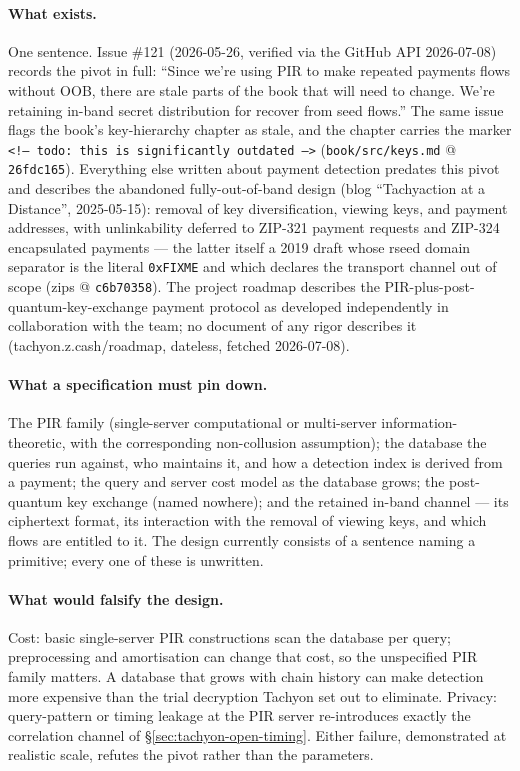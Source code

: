 \documentclass[11pt,a4paper]{article}
\theoremstyle{definition}
\begin{document}
\paragraph{What exists.} One sentence. Issue \#121 (2026-05-26, verified via
the GitHub API 2026-07-08) records the pivot in full: ``Since we're using
PIR to make repeated payments flows without OOB, there are stale parts of
the book that will need to change. We're retaining in-band secret
distribution for recover from seed flows.'' The same issue flags the book's
key-hierarchy chapter as stale, and the chapter carries the marker
\texttt{<!--\ todo: this is significantly outdated -->}
(\texttt{book/src/keys.md} @ \texttt{26fdc165}). Everything else written
about payment detection predates this pivot and describes the abandoned
fully-out-of-band design (blog ``Tachyaction at a Distance'', 2025-05-15):
removal of key diversification, viewing keys, and payment addresses, with
unlinkability deferred to ZIP-321 payment requests and ZIP-324 encapsulated
payments --- the latter itself a 2019 draft whose rseed domain separator is
the literal \texttt{0xFIXME} and which declares the transport channel out of
scope (\textsf{zips} @ \texttt{c6b70358}). The project roadmap describes the
PIR-plus-post-quantum-key-exchange payment protocol as developed
independently in collaboration with the team; no document of any rigor
describes it (tachyon.z.cash/roadmap, dateless, fetched 2026-07-08).

\paragraph{What a specification must pin down.} The PIR family
(single-server computational or multi-server information-theoretic, with
the corresponding non-collusion assumption); the database the queries run
against, who maintains it, and how a detection index is derived from a
payment; the query and server cost model as the database grows; the
post-quantum key exchange (named nowhere); and the retained in-band channel
--- its ciphertext format, its interaction with the removal of viewing keys,
and which flows are entitled to it. The design currently consists of a
sentence naming a primitive; every one of these is unwritten.

\paragraph{What would falsify the design.} Cost: basic single-server PIR
constructions scan the database per query; preprocessing and amortisation
can change that cost, so the unspecified PIR family matters. A database
that grows with chain history can make detection more expensive than the
trial decryption Tachyon set out to eliminate. Privacy: query-pattern or
timing leakage at the PIR server
re-introduces exactly the correlation channel of
\S\ref{sec:tachyon-open-timing}. Either failure, demonstrated at realistic
scale, refutes the pivot rather than the parameters.
\end{document}
